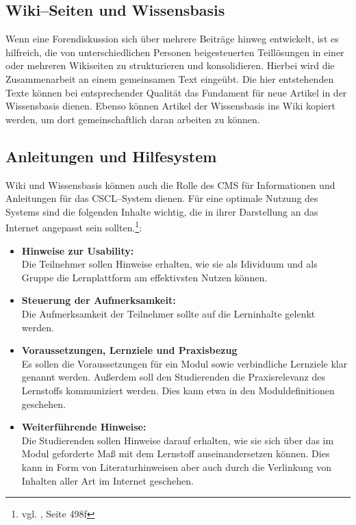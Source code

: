\subsection{Wiki--Seiten und Wissensbasis} %
\label{sub:wiki_seiten_zur_zusammenarbeit}
Wenn eine Forendiskussion sich über mehrere Beiträge hinweg entwickelt, ist es hilfreich, die von unterschiedlichen Personen beigesteuerten Teillösungen in einer oder mehreren Wikiseiten zu strukturieren und konsolidieren. Hierbei wird die Zusammenarbeit an einem gemeinsamen Text eingeübt. Die hier entstehenden Texte können bei entsprechender Qualität das Fundament für neue Artikel in der Wissensbasis dienen. Ebenso können Artikel der Wissensbasis ins Wiki kopiert werden, um dort gemeinschaftlich daran arbeiten zu können.

\subsection{Anleitungen und Hilfesystem} %
\label{sub:anleitungen_und_hilfesystem}
Wiki und Wissensbasis können auch die Rolle des \ac{CMS} für Informationen und Anleitungen für das \ac{CSCL}–System dienen. Für eine optimale Nutzung des Systems sind die folgenden Inhalte wichtig, die in ihrer Darstellung an das Internet angepasst sein sollten.\footnote{vgl. \cite{euler}, Seite 498f}:

\begin{itemize}
	\item \textbf{Hinweise zur Usability:}\\ Die Teilnehmer sollen Hinweise erhalten, wie sie als Idividuum und als Gruppe die Lernplattform am effektivsten Nutzen können.
	\item \textbf{Steuerung der Aufmerksamkeit:}\\ Die Aufmerksamkeit der Teilnehmer sollte auf die Lerninhalte gelenkt werden.
	\item \textbf{Voraussetzungen, Lernziele und Praxisbezug}\\ Es sollen die Voraussetzungen für ein Modul sowie verbindliche Lernziele klar genannt werden. Außerdem soll den Studierenden die Praxisrelevanz des Lernstoffs kommuniziert werden. Dies kann etwa in den Moduldefinitionen geschehen.
	\item \textbf{Weiterführende Hinweise:}\\ Die Studierenden sollen Hinweise darauf erhalten, wie sie sich über das im Modul geforderte Maß mit dem Lernstoff auseinandersetzen können. Dies kann in Form von Literaturhinweisen aber auch durch die Verlinkung von Inhalten aller Art im Internet geschehen.
\end{itemize}


